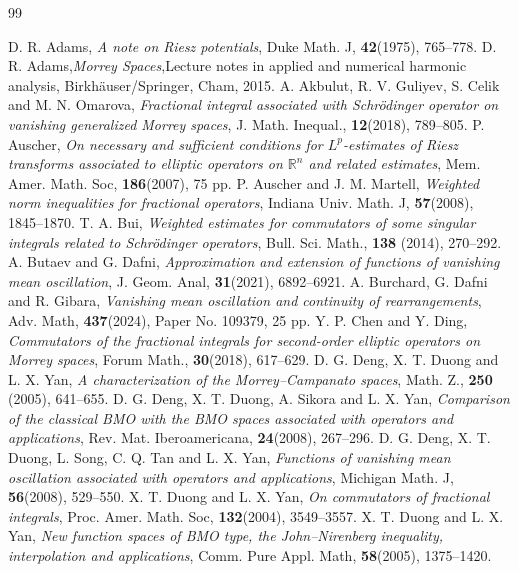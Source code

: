 \documentclass[10pt, reqno]{amsart}
\theoremstyle{definition}
\theoremstyle{remark}
\numberwithin{equation}{section}
\begin{document}

\begin{thebibliography}{99}

D. R. Adams, \emph{A note on Riesz potentials}, Duke Math. J, \textbf{42}(1975), 765--778.
D. R. Adams,\emph{Morrey Spaces},Lecture notes in applied and numerical harmonic analysis, Birkh\"{a}user/Springer, Cham, 2015.
A. Akbulut, R. V. Guliyev, S. Celik and M. N. Omarova, \emph{Fractional integral associated with Schr\"odinger operator on vanishing generalized Morrey spaces}, J. Math. Inequal., \textbf{12}(2018), 789--805.
P. Auscher, \emph{On necessary and sufficient conditions for $L^p$-estimates of Riesz transforms associated to elliptic operators on $\mathbb R^n$ and related estimates}, Mem. Amer. Math. Soc, \textbf{186}(2007), 75 pp.
P. Auscher and J. M. Martell, \emph{Weighted norm inequalities for fractional operators}, Indiana Univ. Math. J, \textbf{57}(2008), 1845--1870.
T. A. Bui, \emph{Weighted estimates for commutators of some singular integrals related to Schr\"odinger operators}, Bull. Sci. Math., \textbf{138} (2014), 270--292.
A. Butaev and G. Dafni, \emph{Approximation and extension of functions of vanishing mean oscillation}, J. Geom. Anal, \textbf{31}(2021), 6892--6921.
A. Burchard, G. Dafni and R. Gibara, \emph{Vanishing mean oscillation and continuity of rearrangements}, Adv. Math, \textbf{437}(2024), Paper No. 109379, 25 pp.
Y. P. Chen and Y. Ding, \emph{Commutators of the fractional integrals for second-order elliptic operators on Morrey spaces}, Forum Math., \textbf{30}(2018), 617--629.
D. G. Deng, X. T. Duong and L. X. Yan, \emph{A characterization of the Morrey--Campanato spaces}, Math. Z., \textbf{250} (2005), 641--655.
D. G. Deng, X. T. Duong, A. Sikora and L. X. Yan, \emph{Comparison of the classical BMO with the BMO spaces associated with operators and applications}, Rev. Mat. Iberoamericana, \textbf{24}(2008), 267--296.
D. G. Deng, X. T. Duong, L. Song, C. Q. Tan and L. X. Yan, \emph{Functions of vanishing mean oscillation associated with operators and applications}, Michigan Math. J, \textbf{56}(2008), 529--550.
X. T. Duong and L. X. Yan, \emph{On commutators of fractional integrals}, Proc. Amer. Math. Soc, \textbf{132}(2004), 3549--3557.
X. T. Duong and L. X. Yan, \emph{New function spaces of BMO type, the John--Nirenberg inequality, interpolation and applications}, Comm. Pure Appl. Math, \textbf{58}(2005), 1375--1420.

\end{thebibliography}
\end{document}
